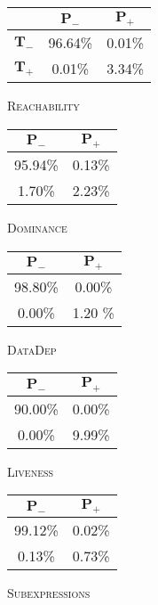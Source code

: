 \centering
\scriptsize
\renewcommand{\arraystretch}{1.5}
\begin{subfigure}{.22\linewidth}
  \centering
  \begin{tabular}{r | c c}
    \toprule
    & $\bm{P_-}$ & $\bm{P_+}$ \\
    \midrule
    $\bm{T_-}$ & 96.64\% & 0.01\% \\
    $\bm{T_+}$ & 0.01\% & 3.34\% \\
    \bottomrule
  \end{tabular}
  \caption{\textsc{Reachability}}
\end{subfigure}
\begin{subfigure}{.17\linewidth}
  \centering
  \begin{tabular}{| c c}
    \toprule
    $\bm{P_-}$ & $\bm{P_+}$ \\
    \midrule
    95.94\% & 0.13\% \\
    1.70\% & 2.23\% \\
    \bottomrule
  \end{tabular}
  \caption{\textsc{Dominance}}
\end{subfigure}
\begin{subfigure}{.17\linewidth}
  \begin{tabular}{| c c}
    \toprule
    $\bm{P_-}$ & $\bm{P_+}$ \\
    \midrule
    98.80\% & 0.00\% \\
    0.00\% & 1.20 \% \\
    \bottomrule
  \end{tabular}
  \caption{\textsc{DataDep}}
\end{subfigure}
\begin{subfigure}{.17\linewidth}
  \centering
  \begin{tabular}{| c c}
    \toprule
    $\bm{P_-}$ & $\bm{P_+}$ \\
    \midrule
    90.00\% & 0.00\% \\
    0.00\% & 9.99\% \\
    \bottomrule
  \end{tabular}
  \caption{\textsc{Liveness}}
\end{subfigure}
\begin{subfigure}{.21\linewidth}
  \begin{tabular}{| c c}
    \toprule
    $\bm{P_-}$ & $\bm{P_+}$ \\
    \midrule
    99.12\% & 0.02\% \\
    0.13\% & 0.73\% \\
    \bottomrule
  \end{tabular}
  \caption{\textsc{Subexpressions}}
\end{subfigure}
